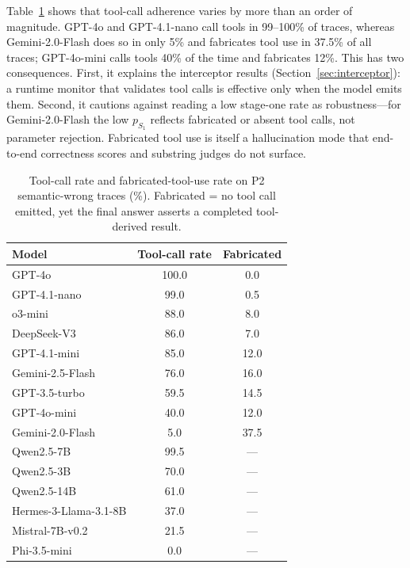 \documentclass{article}
\begin{document}
Table~\ref{tab:toolcall} shows that tool-call adherence varies by more than an
order of magnitude. GPT-4o and GPT-4.1-nano call tools in 99--100\% of traces,
whereas Gemini-2.0-Flash does so in only 5\% and fabricates tool use in 37.5\%
of all traces; GPT-4o-mini calls tools 40\% of the time and fabricates 12\%.
This has two consequences. First, it explains the interceptor results
(Section~\ref{sec:interceptor}): a runtime monitor that validates tool calls is
effective only when the model emits them. Second, it cautions against reading a
low stage-one rate as robustness---for Gemini-2.0-Flash the low $p_{S_1}$
reflects fabricated or absent tool calls, not parameter rejection. Fabricated
tool use is itself a hallucination mode that end-to-end correctness scores and
substring judges do not surface.

\begin{table}[t]
\caption{Tool-call rate and fabricated-tool-use rate on P2 semantic-wrong
traces (\%). Fabricated = no tool call emitted, yet the final answer asserts a
completed tool-derived result.}
\label{tab:toolcall}
\centering\small
\begin{tabular}{lcc}
\toprule
Model & Tool-call rate & Fabricated \\
\midrule
GPT-4o & 100.0 & 0.0 \\
GPT-4.1-nano & 99.0 & 0.5 \\
o3-mini & 88.0 & 8.0 \\
DeepSeek-V3 & 86.0 & 7.0 \\
GPT-4.1-mini & 85.0 & 12.0 \\
Gemini-2.5-Flash & 76.0 & 16.0 \\
GPT-3.5-turbo & 59.5 & 14.5 \\
GPT-4o-mini & 40.0 & 12.0 \\
Gemini-2.0-Flash & 5.0 & 37.5 \\
\midrule
Qwen2.5-7B & 99.5 & --- \\
Qwen2.5-3B & 70.0 & --- \\
Qwen2.5-14B & 61.0 & --- \\
Hermes-3-Llama-3.1-8B & 37.0 & --- \\
Mistral-7B-v0.2 & 21.5 & --- \\
Phi-3.5-mini & 0.0 & --- \\
\bottomrule
\end{tabular}
\end{table}
\end{document}
